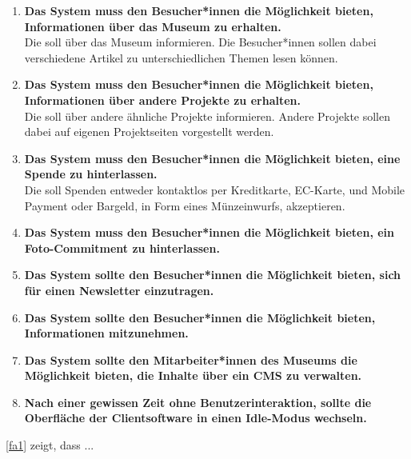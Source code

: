 \begin{enumerate}[label=\textbf{FA\arabic*}]
	\item\label{fa1} \textbf{Das System muss den Besucher*innen die Möglichkeit bieten, Informationen über das Museum zu erhalten.}\\
  Die \shst{} soll über das Museum informieren. Die Besucher*innen sollen dabei verschiedene Artikel zu unterschiedlichen Themen lesen können. 
	\item\label{fa2} \textbf{Das System muss den Besucher*innen die Möglichkeit bieten, Informationen über andere Projekte zu erhalten.}\\
  Die \shst{} soll über andere ähnliche Projekte informieren. Andere Projekte sollen dabei auf eigenen Projektseiten vorgestellt werden.
  \item\label{fa3} \textbf{Das System muss den Besucher*innen die Möglichkeit bieten, eine Spende zu hinterlassen.}\\
  Die \shst{} soll Spenden entweder kontaktlos per Kreditkarte, EC-Karte, und Mobile Payment oder Bargeld, in Form eines Münzeinwurfs, akzeptieren.
  \item\label{fa4} \textbf{Das System muss den Besucher*innen die Möglichkeit bieten, ein Foto-Commitment zu hinterlassen.}\\
  \item\label{fa5} \textbf{Das System sollte den Besucher*innen die Möglichkeit bieten, sich für einen Newsletter einzutragen.}\\ %
  \item\label{fa6} \textbf{Das System sollte den Besucher*innen die Möglichkeit bieten, Informationen mitzunehmen.}\\
  \item\label{fa7} \textbf{Das System sollte den Mitarbeiter*innen des Museums die Möglichkeit bieten, die Inhalte über ein CMS zu verwalten.}\\
  \item\label{fa8} \textbf{Nach einer gewissen Zeit ohne Benutzerinteraktion, sollte die Oberfläche der Clientsoftware in einen
  Idle-Modus wechseln.}\\
\end{enumerate}


\ref{fa1} zeigt, dass ...
